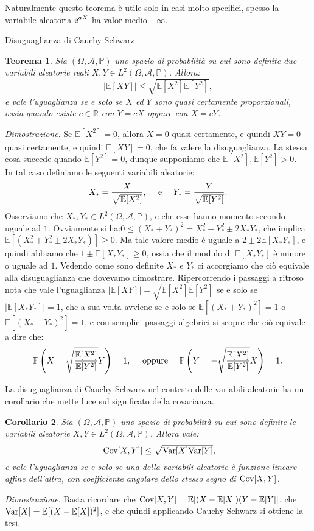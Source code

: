 \documentclass[11pt]{book}
\makeatletter
\theoremstyle{Definizione}
\theoremstyle{TeoremaProposizioneLemmaCorollario}
\newtheorem{myteo}{Teorema}[section]
\newtheorem{mycor}[myteo]{Corollario}
\theoremstyle{OsservazioneNota}
\renewenvironment{proof}[1][\proofname]{\par
  \normalfont \topsep6\p@\@plus6\p@\relax
  \trivlist
  \item[\hskip\labelsep
        \itshape
    #1\@addpunct{.}]\ignorespaces
}{%
  \endtrivlist\@endpefalse
}
\newcommand{\R}{\mathbb{R}}
\renewcommand{\P}{\mathbb{P}}
\newcommand{\e}{\textup{e}}
\newcommand{\E}{\mathbb{E}}
\newcommand{\Cov}{\textup{Cov}}
\newcommand{\Var}{\textup{Var}}
\renewenvironment{proof}{\textsl{Dimostrazione}.}{}
\makeatother
\begin{document}
\noindent
Naturalmente questo teorema è utile solo in casi molto specifici, spesso la variabile aleatoria $\e^{aX}$ ha valor medio $+\infty$.
\begin{boxteo}{Disuguaglianza di Cauchy-Schwarz}
\begin{myteo}
Sia $(\Omega, \mathcal{A},\P)$ uno spazio di probabilità su cui sono definite due variabili aleatorie reali $X,Y\in L^2(\Omega,\mathcal{A},\P)$. Allora:
$$
|\E[XY]|\leq \sqrt{\E[X^2]\E[Y^2]},
$$
e vale l'uguaglianza se e solo se $X$ ed $Y$ sono quasi certamente proporzionali, ossia quando esiste $c\in \R$ con $Y = cX$ oppure con $X = cY$.
\end{myteo}
\tcblower
\begin{proof}
Se $\E[X^2] = 0$, allora $X = 0$ quasi certamente, e quindi $XY = 0$ quasi certamente, e quindi $\E[XY] = 0$, che fa valere la disuguaglianza. La stessa cosa succede quando $\E[Y^2] = 0$, dunque supponiamo che $\E[X^2],\E[Y^2] > 0$.\\
In tal caso definiamo le seguenti variabili aleatorie:
$$
X_* = \frac{X}{\sqrt{\E[X^2]}},\quad \textup{ e }\quad Y_* = \frac{Y}{\sqrt{\E[Y^2]}}.
$$
Osserviamo che $X_*,Y_*\in L^2(\Omega,\mathcal{A},\P)$, e che esse hanno momento secondo uguale ad $1$. Ovviamente si ha:$0 \leq (X_*+Y_*)^2 = X_*^2+Y_*^2 \pm 2X_*Y_*$, che implica $\E[(X_*^2+Y_*^2 \pm 2X_*Y_*)] \geq 0$. Ma tale valore medio è uguale a $2\pm 2\E[X_*Y_*]$, e quindi abbiamo che $1\pm \E[X_*Y_*] \geq 0$, ossia che il modulo di $\E[X_*Y_*]$ è minore o uguale ad $1$. Vedendo come sono definite $X_*$ e $Y_*$ ci accorgiamo che ciò equivale alla disuguaglianza che dovevamo dimostrare. Ripercorrendo i passaggi a ritroso nota che vale l'uguaglianza $|\E[XY]| = \sqrt{\E[X^2]\E[Y^2]}$ se e solo se$ |\E[X_*Y_*]| = 1$, che a sua volta avviene se e solo se $\E[(X_*+Y_*)^2] = 1$ o $\E[(X_*-Y_*)^2] = 1$, e con semplici passaggi algebrici si scopre che ciò equivale a dire che:
$$
\P\left(X = \sqrt{\frac{\E[X^2]}{\E[Y^2]}}Y\right) = 1,\quad \textup{ oppure }\quad \P\left(Y = - \sqrt{\frac{\E[X^2]}{\E[Y^2]}}X\right) = 1.
$$
\end{proof}
\end{boxteo}
\noindent
La disuguaglianza di Cauchy-Schwarz nel contesto delle variabili aleatorie ha un corollario che mette luce sul significato della covarianza.
\begin{boxoss}
\begin{mycor}
Sia $(\Omega,\mathcal{A},\P)$ uno spazio di probabilità su cui sono definite le variabili aleatorie $X,Y\in L^2(\Omega,\mathcal{A},\P)$. Allora vale:
$$
|\Cov[X,Y]| \leq \sqrt{\Var[X]\Var[Y]},
$$
e vale l'uguaglianza se e solo se una della variabili aleatorie è funzione lineare affine dell'altra, con coefficiente angolare dello stesso segno di $\Cov[X,Y]$.
\end{mycor}
\tcblower
\begin{proof}
Basta ricordare che $\Cov[X,Y] = \E[(X-\E[X])(Y-\E[Y]]$, che $\Var[X] = \E[(X-\E[X])^2]$, e che quindi applicando Cauchy-Schwarz si ottiene la tesi.
\end{proof}
\end{boxoss}
\end{document}

